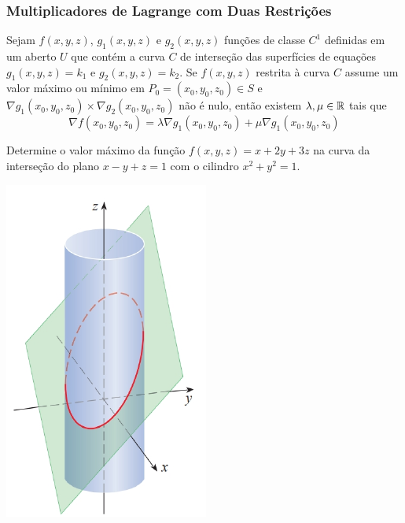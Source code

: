 \begin{frame}[label=otimizacao]
\frametitle{Multiplicadores de Lagrange com Duas Restrições}

\begin{teo}Sejam $f(x,y,z)$, $g_1(x,y,z)$ e $g_2(x,y,z)$  funções de classe $C^1$ definidas em um aberto $U$ que contém a curva $C$ de interseção das superfícies de equações $g_1(x,y,z)=k_1$ e $g_2(x,y,z)=k_2$. Se $f(x,y,z)$ restrita à curva  $C$ assume um valor máximo ou mínimo em $P_0=(x_0,y_0,z_0)\in S$ e $\nabla g_1(x_0,y_0,z_0)\times \nabla g_2(x_0,y_0,z_0)$ não é nulo, então existem $\lambda, \mu \in \mathbb{R}$ tais que
$$\nabla f(x_0,y_0,z_0)=\lambda \nabla g_1(x_0,y_0,z_0)+\mu \nabla g_1(x_0,y_0,z_0)$$ \end{teo} 



\end{frame}


\begin{frame}[label=otimizacao]
\begin{exe}
Determine o valor máximo da função $f(x,y,z)=x+2y+3z$ na curva da interseção do plano $x-y+z=1$ com o cilindro $x^2+y^2=1$.
\end{exe}
\begin{center}
\includegraphics[scale=0.6]{figuras/sec14_8-fig8.png}
\end{center}
\end{frame}